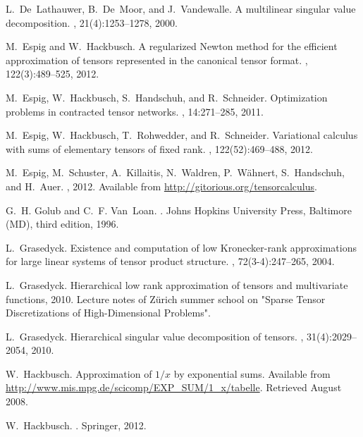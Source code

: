 \documentclass[11pt, a4paper]{article}
\begin{document}
\begin{thebibliography}{10}
L.~De~Lathauwer, B.~De~Moor, and J.~Vandewalle.
\newblock A multilinear singular value decomposition.
, 21(4):1253--1278, 2000.

M.~Espig and W.~Hackbusch.
\newblock A regularized {N}ewton method for the efficient approximation of
  tensors represented in the canonical tensor format.
, 122(3):489--525, 2012.

M.~Espig, W.~Hackbusch, S.~Handschuh, and R.~Schneider.
\newblock Optimization problems in contracted tensor networks.
, 14:271--285, 2011.

M.~Espig, W.~Hackbusch, T.~Rohwedder, and R.~Schneider.
\newblock Variational calculus with sums of elementary tensors of fixed rank.
, 122(52):469--488, 2012.

M.~Espig, M.~Schuster, A.~Killaitis, N.~Waldren, P.~W\"ahnert, S.~Handschuh,
  and H.~Auer.
, 2012.
\newblock Available from \url{http://gitorious.org/tensorcalculus}.

G.~H. Golub and C.~F. Van~Loan.
.
\newblock Johns Hopkins University Press, Baltimore (MD), third edition, 1996.

L.~Grasedyck.
\newblock Existence and computation of low {K}ronecker-rank approximations for
  large linear systems of tensor product structure.
, 72(3-4):247--265, 2004.

L.~Grasedyck.
\newblock Hierarchical low rank approximation of tensors and multivariate
  functions, 2010.
\newblock Lecture notes of Z\"urich summer school on "Sparse Tensor
  Discretizations of High-Dimensional Problems".

L.~Grasedyck.
\newblock Hierarchical singular value decomposition of tensors.
, 31(4):2029--2054, 2010.

W.~Hackbusch.
\newblock Approximation of $1/x$ by exponential sums.
\newblock Available from
  \url{http://www.mis.mpg.de/scicomp/EXP_SUM/1_x/tabelle}. Retrieved August
  2008.

W.~Hackbusch.
.
\newblock Springer, 2012.


\end{thebibliography}
\end{document}
